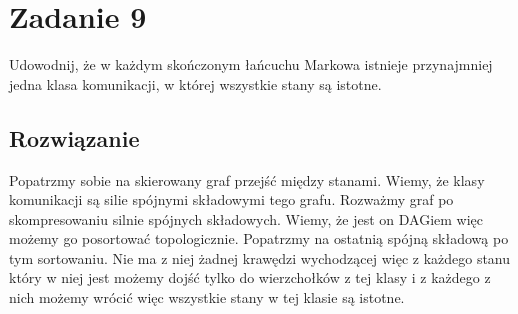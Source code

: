 \section{Zadanie 9}
Udowodnij, że w każdym skończonym łańcuchu Markowa istnieje przynajmniej jedna klasa komunikacji, w której wszystkie stany są istotne.

\subsection*{Rozwiązanie}

Popatrzmy sobie na skierowany graf przejść między stanami. Wiemy, że klasy komunikacji są silie spójnymi składowymi tego grafu. Rozważmy graf po skompresowaniu silnie spójnych składowych. Wiemy, że jest on DAGiem więc możemy go posortować topologicznie. Popatrzmy na ostatnią spójną składową po tym sortowaniu. Nie ma z niej żadnej krawędzi wychodzącej więc z każdego stanu który w niej jest możemy dojść tylko do wierzchołków z tej klasy i z każdego z nich możemy wrócić więc wszystkie stany w tej klasie są istotne.

